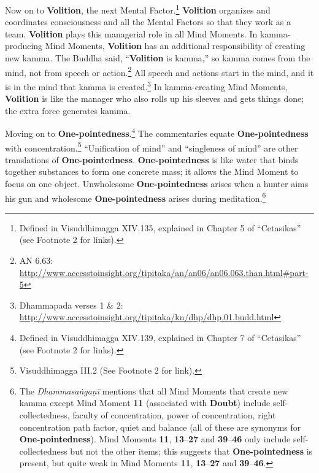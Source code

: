 Now on to \textbf{Volition}, the next Mental Factor.\footnote{Defined in Visuddhimagga XIV.135, explained in Chapter 5 of “Cetasikas” (see Footnote 2 for links).} \textbf{Volition} organizes and coordinates consciousness and all the Mental Factors so that they work as a team. \textbf{Volition} plays this managerial role in all Mind Moments. In kamma-producing Mind Moments, \textbf{Volition} has an additional responsibility of creating new kamma. The Buddha said, “\textbf{Volition} is kamma,” so kamma comes from the mind, not from speech or action.\footnote{AN 6.63: \url{http://www.accesstoinsight.org/tipitaka/an/an06/an06.063.than.html\#part-5}} All speech and actions start in the mind, and it is in the mind that kamma is created.\footnote{Dhammapada verses 1 \& 2:  \url{http://www.accesstoinsight.org/tipitaka/kn/dhp/dhp.01.budd.html}} In kamma-creating Mind Moments, \textbf{Volition} is like the manager who also rolls up his sleeves and gets things done; the extra force generates kamma.

Moving on to \textbf{One-pointedness}.\footnote{Defined in Visuddhimagga XIV.139, explained in Chapter 7 of “Cetasikas” (see Footnote 2 for links).} The commentaries equate \textbf{One-pointedness} with concentration.\footnote{Visuddhimagga III.2 (See Footnote 2 for link).} “Unification of mind” and “singleness of mind” are other translations of \textbf{One-pointedness}. \textbf{One-pointedness} is like water that binds together substances to form one concrete mass; it allows the Mind Moment to focus on one object. Unwholesome \textbf{One-pointedness} arises when a hunter aims his gun and wholesome \textbf{One-pointedness} arises during meditation.\footnote{The \textit{Dhammasaṅgaṇī} mentions that all Mind Moments that create new kamma except Mind Moment \textbf{11} (associated with \textbf{Doubt}) include self-collectedness, faculty of concentration, power of concentration, right concentration path factor, quiet and balance (all of these are synonyms for \textbf{One-pointedness}). Mind Moments \textbf{11}, \textbf{13}--\textbf{27} and \textbf{39}--\textbf{46} only include self-collectedness but not the other items; this suggests that \textbf{One-pointedness} is present, but quite weak in Mind Moments \textbf{11}, \textbf{13}--\textbf{27} and \textbf{39}--\textbf{46}.}

